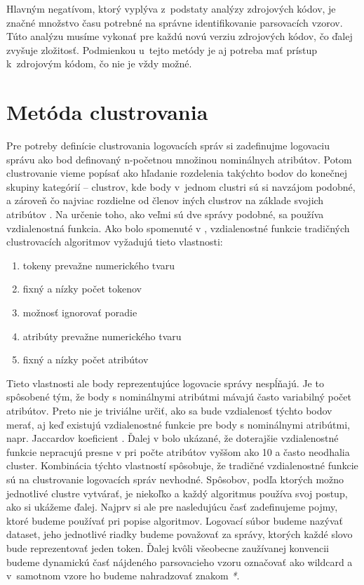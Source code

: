 Hlavným negatívom, ktorý vyplýva z~podstaty analýzy zdrojových kódov, je značné množstvo času potrebné na správne identifikovanie parsovacích vzorov. Túto analýzu musíme vykonať pre každú novú verziu zdrojových kódov, čo ďalej zvyšuje zložitosť. Podmienkou u~tejto metódy je aj potreba mať prístup k~zdrojovým kódom, čo nie je vždy možné. 

\section{ Metóda clustrovania}
Pre potreby definície clustrovania logovacích správ si zadefinujme logovaciu správu ako bod definovaný n-početnou množinou nominálnych atribútov. Potom clustrovanie vieme popísať ako hľadanie rozdelenia takýchto bodov do konečnej skupiny kategórií -- clustrov, kde body v~jednom clustri sú si navzájom podobné, a zároveň čo najviac rozdielne od členov iných clustrov na základe svojich atribútov \parencite{iplom}. Na určenie toho, ako veľmi sú dve správy podobné, sa používa vzdialenostná funkcia. Ako bolo spomenuté v \parencite{logcluster}, vzdialenostné funkcie tradičných clustrovacích algoritmov vyžadujú tieto vlastnosti: 

\begin{enumerate}
  \item tokeny prevažne numerického tvaru
  \item fixný a nízky počet tokenov
  \item možnosť ignorovať poradie
  \item atribúty prevažne numerického tvaru 
  \item fixný a nízky počet atribútov 
\end{enumerate}

Tieto vlastnosti ale body reprezentujúce logovacie správy nespĺňajú. Je to spôsobené tým, že body s nominálnymi atribútmi mávajú často variabilný počet atribútov. Preto nie je triviálne určiť, ako sa bude vzdialenosť týchto bodov merať, aj keď existujú vzdialenostné funkcie pre body s nominálnymi atribútmi, napr. Jaccardov koeficient \parencite{slct}. Ďalej v \parencite{logcluster} bolo ukázané, že doterajšie vzdialenostné funkcie nepracujú presne v pri počte atribútov vyššom ako 10 a často neodhalia cluster. Kombinácia týchto vlastností spôsobuje, že tradičné vzdialenostné funkcie sú na clustrovanie logovacích správ nevhodné. Spôsobov, podľa ktorých možno jednotlivé clustre vytvárať, je niekoľko a každý algoritmus používa svoj postup, ako si ukážeme ďalej. Najprv si ale pre nasledujúcu časť zadefinujeme pojmy, ktoré budeme používať pri popise algoritmov. Logovací súbor budeme nazývať dataset, jeho jednotlivé riadky budeme považovať za správy, ktorých každé slovo bude reprezentovať jeden token. Ďalej kvôli všeobecne zaužívanej konvencii budeme dynamickú časť nájdeného parsovacieho vzoru označovať ako wildcard a v~samotnom vzore ho budeme nahradzovať znakom \emph{*}. 


